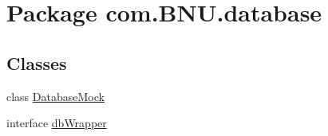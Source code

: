 \hypertarget{namespacecom_1_1_b_n_u_1_1database}{}\section{Package com.\+B\+N\+U.\+database}
\label{namespacecom_1_1_b_n_u_1_1database}
\subsection*{Classes}
\begin{DoxyCompactItemize}
\item 
class \mbox{\hyperlink{classcom_1_1_b_n_u_1_1database_1_1_database_mock}{Database\+Mock}}
\item 
interface \mbox{\hyperlink{interfacecom_1_1_b_n_u_1_1database_1_1db_wrapper}{db\+Wrapper}}
\end{DoxyCompactItemize}
